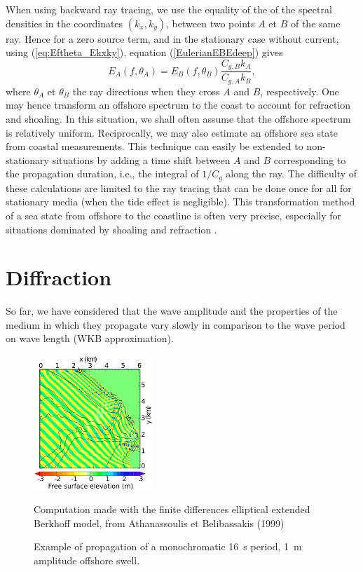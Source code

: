 When using backward ray tracing, we use the equality of the
 of the spectral densities in the coordinates $(k_x,k_y)$, between two points $A$ et $B$ 
 of the same ray. Hence for a zero source term, and in the stationary case without current, 
 using (\ref{eq:Eftheta_Ekxky}), equation (\ref{EulerianEBEdeep}) gives
 \begin{equation}
 E_A(f,\theta_A)=E_B(f,\theta_B)\frac{C_{g,B} k_A}{C_{g,A} k_B}\label{eq:ray_model},
\end{equation}
where $\theta_A$ et $\theta_B$ the ray directions when they cross $A$ and $B$, respectively.
One may hence transform an offshore spectrum to the coast to account for refraction and shoaling.
In this situation, we shall often assume that the offshore  spectrum is relatively uniform. 
Reciprocally, we may also estimate an offshore sea state from coastal measurements.
This technique can easily be extended to non-stationary situations by adding a time shift between
$A$ and $B$ corresponding to the propagation duration, i.e., the integral of $1/C_g$ along the ray.
The difficulty of these calculations are limited to the ray tracing that can be done once for all 
for stationary media (when the tide effect is negligible). This transformation method of a sea state
from offshore to the coastline is often very precise, especially for situations dominated by shoaling
and refraction \citep{OReilly&Guza1993,Ardhuin&al.2003a,Ardhuin2006a,Magne&al.2007}.





\section{Diffraction}
So far, we have considered that the wave amplitude and the properties of the medium in which they
propagate vary slowly in comparison to the wave period on wave length (WKB approximation).
\begin{figure}
\centerline{\includegraphics[width=0.4\textwidth]{FIGS_CH_SHALLOWLIN/NTUA_NCEX_en.png}}
  \caption{Example of propagation of a monochromatic 16~s period, 1~m amplitude offshore swell.}
  {Computation made with the finite differences elliptical extended Berkhoff model, from Athanassoulis et Belibassakis
  (1999)}
   \label{NTUA_NCEX}
  \end{figure}

